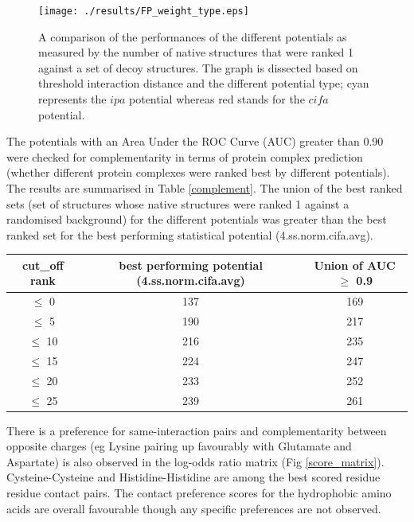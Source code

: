 \begin{figure}[H]
	\centering
	\texttt{[image: ./results/FP\_weight\_type.eps]}
	\caption[Pairwise potential performance based on distance threshold]{A comparison of the performances of the different potentials as measured by the number of native structures that were ranked 1 against a set of decoy structures. The graph is dissected based on threshold interaction distance and the different potential type; cyan represents the $ipa$ potential whereas red stands for the $cifa$ potential.}
	\label{pot_type}
\end{figure}

\par 
The potentials with an Area Under the ROC Curve (AUC) greater than 0.90 were checked for complementarity in terms of protein complex prediction (whether different protein complexes were ranked best by different potentials). The results are summarised in Table \ref{complement}. The union of the best ranked sets (set of structures whose native structures were ranked 1 against a randomised background) for the different potentials was greater than the best ranked set for the best performing statistical potential (4.ss.norm.cifa.avg).

\begin{center}
	\begin{tabular}{ | c | c | c | }
	\hline
	cut\_off rank & best performing potential (4.ss.norm.cifa.avg) & Union of AUC $\geq$ 0.9 \\ \hline
	$\leq$ 0 & 137 & 169 \\ \hline
	$\leq$ 5 & 190 & 217 \\ \hline
	$\leq$ 10 & 216 & 235 \\ \hline
	$\leq$ 15 & 224 & 247 \\ \hline
	$\leq$ 20 & 233 & 252 \\ \hline
	$\leq$ 25 & 239 & 261 \\ \hline
	\end{tabular}
	\label{complement}
\end{center}

There is a preference for same-interaction pairs and complementarity between opposite charges (eg Lysine pairing up favourably with Glutamate and Aspartate) is also observed in the log-odds ratio matrix (Fig \ref{score_matrix}). Cysteine-Cysteine and Histidine-Histidine are among the best scored residue residue contact pairs. The contact preference scores for the hydrophobic amino acids are overall favourable though any specific preferences are not observed.

